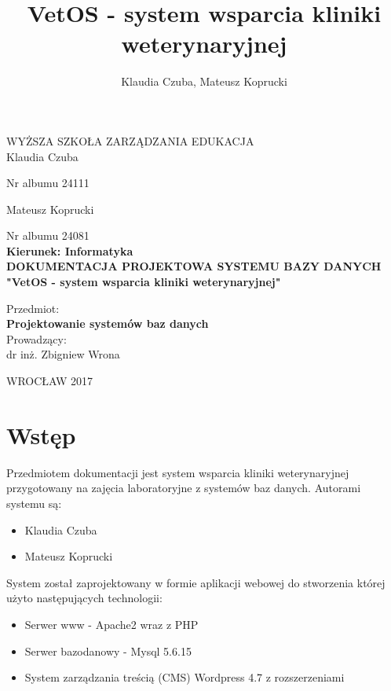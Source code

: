 \documentclass[10pt,a4paper]{article}
\author{Klaudia Czuba, Mateusz Koprucki}
\title{VetOS - system wsparcia kliniki weterynaryjnej}
\date{}
\begin{document}
	\setlength{\topmargin}{-2cm}
\thispagestyle {empty}
\begin{center}
{\LARGE WYŻSZA SZKOŁA ZARZĄDZANIA EDUKACJA}\\[50]








Klaudia Czuba


	Nr albumu 24111
	
	
	Mateusz Koprucki
	
	
	Nr albumu 24081\\[50]
	
	\textbf{Kierunek: Informatyka}\\[50]
	
	{\LARGE \textbf{DOKUMENTACJA PROJEKTOWA SYSTEMU BAZY DANYCH} \\[20]
	
	\textbf{"VetOS - system wsparcia kliniki weterynaryjnej"}}\\[60]
	

\end{center}

\begin{flushright}
	Przedmiot:\\
	\textbf{Projektowanie systemów baz danych}\\[70]
	Prowadzący:\\
	dr inż. Zbigniew Wrona\\[70]
\end{flushright}
\begin{center}
	WROCŁAW 2017
\end{center}

	\newpage
	\tableofcontents
	\newpage
	
	\section{Wstęp}
	Przedmiotem dokumentacji jest system wsparcia kliniki weterynaryjnej przygotowany na zajęcia laboratoryjne z systemów baz danych. Autorami systemu są:
		\begin{itemize}
			\item Klaudia Czuba
			\item Mateusz Koprucki
		\end{itemize}
	System został zaprojektowany w formie aplikacji webowej do stworzenia której użyto następujących technologii:
		\begin{itemize}
			\item Serwer www - Apache2 wraz z PHP
			\item Serwer bazodanowy - Mysql 5.6.15
			\item System zarządzania treścią (CMS) Wordpress 4.7 z rozszerzeniami
		\end{itemize}
\end{document}
